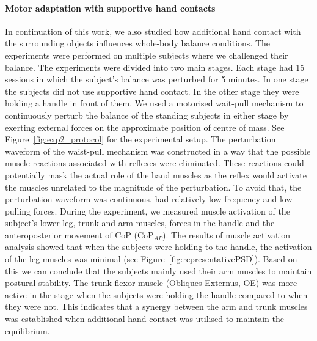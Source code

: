 \documentclass[final,5p,twocolumn]{elsarticle}
\begin{document}
\paragraph{Motor adaptation with supportive hand contacts} In continuation of this work, we also studied how additional hand contact with the surrounding objects influences whole-body balance conditions. The experiments were performed on multiple subjects where we challenged their balance. The experiments were divided into two main stages. Each stage had 15 sessions in which the subject's balance was perturbed for 5 minutes. In one stage the subjects did not use supportive hand contact. In the other stage they were holding a handle in front of them. We used a motorised wait-pull mechanism \cite{Peternel2013} to continuously perturb the balance of the standing subjects in either stage by exerting external forces on the approximate position of centre of mass. See Figure~\ref{fig:exp2_protocol} for the experimental setup. The perturbation waveform of the waist-pull mechanism was constructed in a way that the possible muscle reactions associated with reflexes were eliminated. These reactions could potentially mask the actual role of the hand muscles as the reflex would activate the muscles unrelated to the magnitude of the perturbation. To avoid that, the perturbation waveform was continuous, had relatively low frequency and low pulling forces. During the experiment, we measured muscle activation of the subject's lower leg, trunk and arm muscles, forces in the handle and the anteroposterior movement of CoP (CoP$_{AP}$). The results of muscle activation analysis showed that when the subjects were holding to the handle, the activation of the leg muscles was minimal (see Figure~\ref{fig:representativePSD}). Based on this we can conclude that the subjects mainly used their arm muscles to maintain postural stability. The trunk flexor muscle (Obliques Externus, OE) was more active in the stage when the subjects were holding the handle compared to when they were not. This indicates that a synergy between the arm and trunk muscles was established when additional hand contact was utilised to maintain the equilibrium.
\end{document}
